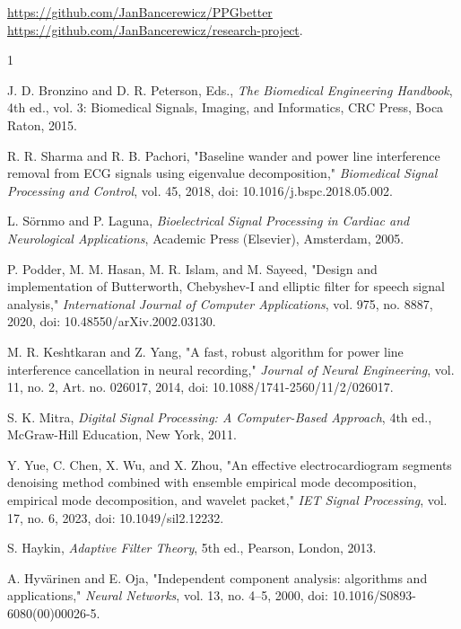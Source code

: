 \documentclass{citask}
\begin{document}
\noindent
\href{https://github.com/JanBancerewicz/PPGbetter}{https://github.com/JanBancerewicz/PPGbetter} \\
\href{https://github.com/JanBancerewicz/research-project}{https://github.com/JanBancerewicz/research-project}.


\begin{thebibliography}{1}

J. D. Bronzino and D. R. Peterson, Eds., \emph{The Biomedical Engineering Handbook}, 4th ed., vol. 3: Biomedical Signals, Imaging, and Informatics, CRC Press, Boca Raton, 2015.

R. R. Sharma and R. B. Pachori, "Baseline wander and power line interference removal from ECG signals using eigenvalue decomposition," \emph{Biomedical Signal Processing and Control}, vol. 45, 2018, doi: 10.1016/j.bspc.2018.05.002.

L. Sörnmo and P. Laguna, \emph{Bioelectrical Signal Processing in Cardiac and Neurological Applications}, Academic Press (Elsevier), Amsterdam, 2005.

P. Podder, M. M. Hasan, M. R. Islam, and M. Sayeed, "Design and implementation of Butterworth, Chebyshev-I and elliptic filter for speech signal analysis," \emph{International Journal of Computer Applications}, vol. 975, no. 8887, 2020, doi: 10.48550/arXiv.2002.03130.

M. R. Keshtkaran and Z. Yang, "A fast, robust algorithm for power line interference cancellation in neural recording," \emph{Journal of Neural Engineering}, vol. 11, no. 2, Art. no. 026017, 2014, doi: 10.1088/1741-2560/11/2/026017.

S. K. Mitra, \emph{Digital Signal Processing: A Computer-Based Approach}, 4th ed., McGraw-Hill Education, New York, 2011.

Y. Yue, C. Chen, X. Wu, and X. Zhou, "An effective electrocardiogram segments denoising method combined with ensemble empirical mode decomposition, empirical mode decomposition, and wavelet packet," \emph{IET Signal Processing}, vol. 17, no. 6, 2023, doi: 10.1049/sil2.12232.

S. Haykin, \emph{Adaptive Filter Theory}, 5th ed., Pearson, London, 2013.

A. Hyvärinen and E. Oja, "Independent component analysis: algorithms and applications," \emph{Neural Networks}, vol. 13, no. 4–5, 2000, doi: 10.1016/S0893-6080(00)00026-5.


\end{thebibliography}
\end{document}
